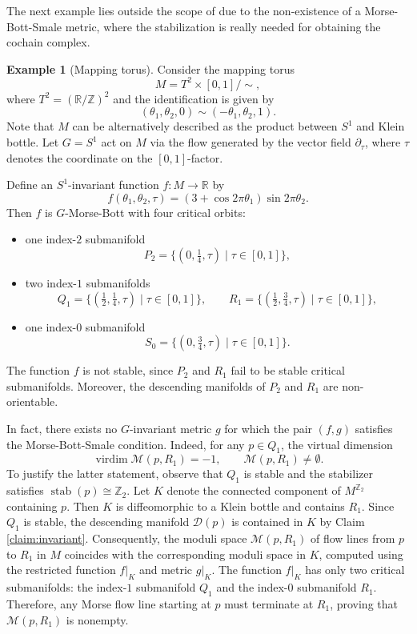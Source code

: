 \documentclass[11pt]{amsart}
\theoremstyle{definition}
\newtheorem{example}[theorem]{Example}
\numberwithin{equation}{subsection}
\newcommand{\ZZ}{\mathbb{Z}}
\newcommand{\op}{\operatorname}
\newcommand{\R}{\mathbb{R}}
\DeclareMathOperator{\stab}{stab}
\newcommand{\p}{\partial}
\newcommand{\des}{\mathscr{D}}
\begin{document}
The next example lies outside the scope of \cite{AustinBraam} due to the non-existence of a Morse-Bott-Smale metric, where the stabilization is really needed for obtaining the cochain complex.

\begin{example}[Mapping torus]\label{example:mapping torus}
    Consider the mapping torus
		\[
		M = T^2 \times [0,1] / {\sim},
		\]
		where $T^2 = (\R/\ZZ)^2$ and the identification is given by
		\[
		(\theta_1, \theta_2, 0) \sim (-\theta_1, \theta_2, 1).
		\]
		Note that $M$ can be alternatively described as the product between $S^1$ and Klein bottle. Let $G = S^1$ act on $M$ via the flow generated by the vector field $\p_\tau$, where $\tau$ denotes the coordinate on the $[0,1]$-factor.
		
		Define an $S^1$-invariant function $f: M \to \R$ by
		\[
		f(\theta_1, \theta_2, \tau) = (3 + \cos 2\pi \theta_1)\sin 2\pi \theta_2 .
		\]
		Then $f$ is $G$-Morse-Bott with four critical orbits:
		\begin{itemize}
			\item one index-$2$ submanifold
			\[
			P_2 = \bigl\{(0, \tfrac14, \tau) \mid \tau \in [0,1]\bigr\},
			\]
			\item two index-$1$ submanifolds
			\[
			Q_1 = \bigl\{(\tfrac12, \tfrac14, \tau) \mid \tau \in [0,1]\bigr\},
			\qquad
			R_1 = \bigl\{(\tfrac12, \tfrac34, \tau) \mid \tau \in [0,1]\bigr\},
			\]
			\item one index-$0$ submanifold
			\[
			S_0 = \bigl\{(0, \tfrac34, \tau) \mid \tau \in [0,1]\bigr\}.
			\]
		\end{itemize}
		
		The function $f$ is not stable, since $P_2$ and $R_1$ fail to be stable critical submanifolds. Moreover, the descending manifolds of $P_2$ and $R_1$ are non-orientable.
		
		In fact, there exists no $G$-invariant metric $g$ for which the pair $(f,g)$ satisfies the Morse-Bott-Smale condition. Indeed, for any $p \in Q_1$, the virtual dimension
		\[
		\op{virdim} \mathcal{M}(p, R_1) = -1,
		\qquad 
		\mathcal{M}(p, R_1) \neq \emptyset .
		\]
		To justify the latter statement, observe that $Q_1$ is stable and the stabilizer satisfies $\stab(p) \cong \ZZ_2$. Let $K$ denote the connected component of $M^{\ZZ_2}$ containing $p$. Then $K$ is diffeomorphic to a Klein bottle and contains $R_1$. Since $Q_1$ is stable, the descending manifold $\des(p)$ is contained in $K$ by Claim \ref{claim:invariant}. Consequently, the moduli space $\mathcal{M}(p, R_1)$ of flow lines from $p$ to $R_1$ in $M$ coincides with the corresponding moduli space in $K$, computed using the restricted function $f|_K$ and metric $g|_K$. The function $f|_K$ has only two critical submanifolds: the index-$1$ submanifold $Q_1$ and the index-$0$ submanifold $R_1$. Therefore, any Morse flow line starting at $p$ must terminate at $R_1$, proving that $\mathcal{M}(p, R_1)$ is nonempty.


\end{example}
\end{document}
